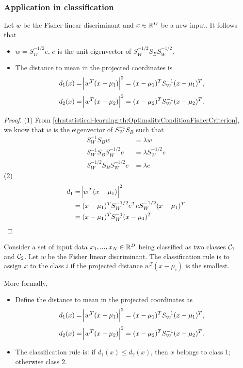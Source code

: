 \begin{refsection}
\subsubsection{Application in classification}

\begin{lemma}
Let $w$ be the Fisher linear discriminant and $x\in\mathbb{R}^D$ be a new input.	It follows that
\begin{itemize}
	\item 	$w = S_W^{-1/2}e$, $e$ is the unit eigenvector of $S_W^{-1/2}S_BS_W^{-1/2}$.
	\item  The distance to mean in the projected coordinates is
	$$d_1(x) = \abs{w^T(x - \mu_1)}^2 = (x-\mu_1)^TS_W^{-1}(x-\mu_1)^T,$$
	$$d_2(x) = \abs{w^T(x - \mu_2)}^2 = (x-\mu_2)^TS_W^{-1}(x-\mu_2)^T.$$
\end{itemize}	
\end{lemma}
\begin{proof}
(1)	From \autoref{ch:statistical-learning:th:OptimalityConditionFisherCriterion}, we know that $w$ is the eigenvector of $S_W^{-1}S_B$ such that
\begin{align*}
S_W^{-1}S_B w &= \lambda w \\
S_W^{-1}S_B S_W^{-1/2}e &= \lambda S_W^{-1/2}e \\
S_W^{-1/2}S_B S_W^{-1/2}e &= \lambda e 
\end{align*}
(2) 
\begin{align*}
d_1 &= \abs{w^T(x - \mu_1)}^2 \\
    &= (x-\mu_1)^TS_W^{-1/2}e^TeS_W^{-1/2}(x-\mu_1)^T \\
    &= (x-\mu_1)^TS_W^{-1}(x-\mu_1)^T 
\end{align*}
\end{proof}



\begin{method}
Consider a set of input data $x_1,...,x_N\in \mathbb{R}^D$ being classified as two classes $\mathcal{C}_1$ and $\mathcal{C}_2$. Let $w$ be the Fisher linear discriminant. The classification rule is to assign $x$ to the class $i$ if the projected distance $w^T(x-\mu_i)$ is the smallest.

More formally, 
\begin{itemize}
	\item  Define the distance to mean in the projected coordinates as
	$$d_1(x) = \abs{w^T(x - \mu_1)}^2 = (x-\mu_1)^TS_W^{-1}(x-\mu_1)^T,$$
	$$d_2(x) = \abs{w^T(x - \mu_2)}^2 = (x-\mu_2)^TS_W^{-1}(x-\mu_2)^T.$$
	\item The classification rule is: if $d_1(x)\leq d_2(x)$, then $x$ belongs to class 1; otherwise class 2.
\end{itemize}	
\end{method}



\end{refsection}
